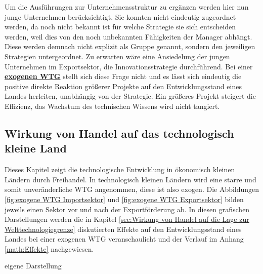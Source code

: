 Um die Ausführungen zur Unternehmensstruktur zu ergänzen werden hier nun junge Unternehmen berücksichtigt. Sie konnten nicht eindeutig zugeordnet werden, da noch nicht bekannt ist für welche Strategie sie sich entscheiden werden, weil dies von den noch unbekannten Fähigkeiten der Manager abhängt. Diese werden demnach nicht explizit als Gruppe genannt, sondern den jeweiligen Strategien untergeordnet. Zu erwarten wäre eine Ansiedelung der jungen Unternehmen im Exportsektor, die Innovationsstrategie durchführend. 
Bei einer \textbf{\uline{exogenen WTG}} stellt sich diese Frage nicht und es lässt sich eindeutig die positive direkte Reaktion größerer Projekte auf den Entwicklungsstand eines Landes herleiten, unabhängig von der Strategie. Ein größeres Projekt steigert die Effizienz, das Wachstum des technischen Wissens wird nicht tangiert. 

\subsection{Wirkung von Handel auf das technologisch kleine Land}\label{sec:Wirkung von Handel auf das technologisch kleine Land}
Dieses  Kapitel zeigt  die technologische Entwicklung in ökonomisch kleinen Ländern durch Freihandel. In technologisch kleinen Ländern wird eine starre und somit unveränderliche WTG angenommen, diese ist also exogen. Die Abbildungen \ref{fig:exogene WTG Importsektor} und \ref{fig:exogene WTG Exportsektor} bilden jeweils einen Sektor vor und nach der Exportförderung ab. In diesen grafischen Darstellungen werden die in Kapitel \ref{sec:Wirkung von Handel auf die Lage zur Welttechnologiegrenze} diskutierten Effekte auf den Entwicklungsstand eines Landes bei einer exogenen WTG veranschaulicht und der Verlauf im Anhang \ref{math:Effekte} nachgewiesen. 


	\begin{figure*}[htb]
  	\hfill{}  eigene Darstellung
		\caption{exogene WTG im Importsektor}
		\label{fig:exogene WTG Importsektor}
	\end{figure*}


